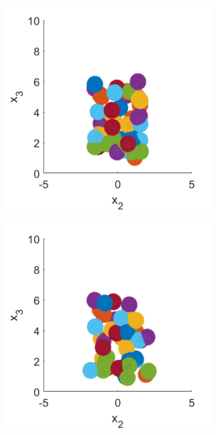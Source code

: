 \begin{figure}
\centering
\begin{subfigure}[b]{0.2\textwidth}
    \centering
    \includegraphics[width=\textwidth]{Images/squirmers/Gyro-1-All.pdf}
    \caption[]{\label{fig:squirmerPosA}}
\end{subfigure}
\begin{subfigure}[b]{0.2\textwidth}
    \centering
    \includegraphics[width=\textwidth]{Images/squirmers/Gyro-2-All.pdf}

\end{subfigure}
\end{figure}
